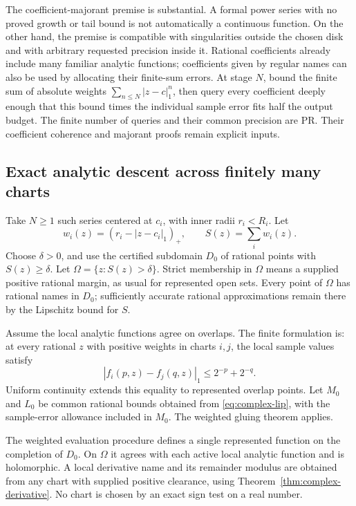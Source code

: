 The coefficient-majorant premise is substantial. A formal power series with no proved growth or tail bound is not automatically a continuous function. On the other hand, the premise is compatible with singularities outside the chosen disk and with arbitrary requested precision inside it. Rational coefficients already include many familiar analytic functions; coefficients given by regular names can also be used by allocating their finite-sum errors. At stage \(N\), bound the finite sum of absolute weights \(\sum_{n\leq N}|z-c|_1^n\), then query every coefficient deeply enough that this bound times the individual sample error fits half the output budget. The finite number of queries and their common precision are PR. Their coefficient coherence and majorant proofs remain explicit inputs.

\subsection{Exact analytic descent across finitely many charts}

Take \(N\geq1\) such series centered at \(c_i\), with inner radii \(r_i<R_i\). Let
\[
 w_i(z)=(r_i-|z-c_i|_1)_+,\qquad S(z)=\sum_iw_i(z).
\]
Choose \(\delta>0\), and use the certified subdomain \(D_0\) of rational points with \(S(z)\geq\delta\). Let \(\Omega=\{z:S(z)>\delta\}\). Strict membership in \(\Omega\) means a supplied positive rational margin, as usual for represented open sets. Every point of \(\Omega\) has rational names in \(D_0\); sufficiently accurate rational approximations remain there by the Lipschitz bound for \(S\).

Assume the local analytic functions agree on overlaps. The finite formulation is: at every rational \(z\) with positive weights in charts \(i,j\), the local sample values satisfy
\begin{equation}
 |f_i(p,z)-f_j(q,z)|_1\leq2^{-p}+2^{-q}.
 \label{eq:analytic-overlap}
\end{equation}
Uniform continuity extends this equality to represented overlap points. Let \(M_0\) and \(L_0\) be common rational bounds obtained from \eqref{eq:complex-lip}, with the sample-error allowance included in \(M_0\). The weighted gluing theorem applies.

\begin{corollary}\label{cor:analytic-descent}
The weighted evaluation procedure defines a single represented function on the completion of \(D_0\). On \(\Omega\) it agrees with each active local analytic function and is holomorphic. A local derivative name and its remainder modulus are obtained from any chart with supplied positive clearance, using Theorem~\ref{thm:complex-derivative}. No chart is chosen by an exact sign test on a real number.
\end{corollary}

